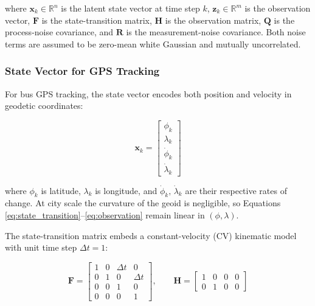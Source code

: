 \documentclass[12pt, a4paper]{article}
\begin{document}
\noindent where $\mathbf{x}_k \in \mathbb{R}^n$ is the latent state vector at
time step $k$, $\mathbf{z}_k \in \mathbb{R}^m$ is the observation vector,
$\mathbf{F}$ is the state-transition matrix, $\mathbf{H}$ is the observation
matrix, $\mathbf{Q}$ is the process-noise covariance, and $\mathbf{R}$ is the
measurement-noise covariance. Both noise terms are assumed to be zero-mean
white Gaussian and mutually uncorrelated.

\subsubsection{State Vector for GPS Tracking}

For bus GPS tracking, the state vector encodes both position and velocity in
geodetic coordinates:

\begin{equation}
    \mathbf{x}_k =
    \begin{bmatrix}
        \phi_k \\ \lambda_k \\ \dot{\phi}_k \\ \dot{\lambda}_k
    \end{bmatrix}
    \label{eq:state_vector}
\end{equation}

\noindent where $\phi_k$ is latitude, $\lambda_k$ is longitude, and
$\dot{\phi}_k,\,\dot{\lambda}_k$ are their respective rates of change. At
city scale the curvature of the geoid is negligible, so Equations
\eqref{eq:state_transition}--\eqref{eq:observation} remain linear in
$(\phi, \lambda)$.

The state-transition matrix embeds a constant-velocity (CV) kinematic model
with unit time step $\Delta t = 1$:

\begin{equation}
    \mathbf{F} =
    \begin{bmatrix}
        1 & 0 & \Delta t & 0 \\
        0 & 1 & 0 & \Delta t \\
        0 & 0 & 1 & 0 \\
        0 & 0 & 0 & 1
    \end{bmatrix},
    \qquad
    \mathbf{H} =
    \begin{bmatrix}
        1 & 0 & 0 & 0 \\
        0 & 1 & 0 & 0
    \end{bmatrix}
    \label{eq:matrices}
\end{equation}
\end{document}
